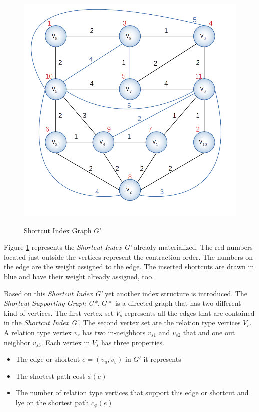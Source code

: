 \documentclass[twocolumn]{article}
\begin{document}
\begin{figure}[h]
    \caption{Shortcut Index Graph $G'$}
    \centering
    \includegraphics[width=\linewidth]{cchGraph}
    \label{fig:shortcutIndex}
\end{figure}

Figure \ref{fig:shortcutIndex} represents the \textit{Shortcut Index G'} already materialized. The red numbers
located just outside the vertices represent the contraction order. The numbers on the edge are the weight
assigned to the edge. The inserted shortcuts are drawn in blue and have their weight already assigned, too.

Based on this \textit{Shortcut Index G'} yet another index structure is introduced. The \textit{Shortcut Supporting Graph G*}.
$G*$ is a directed graph that has two different kind of vertices. The first vertex set $V_s$ represents all the
edges that are contained in the \textit{Shortcut Index G'}. The second vertex set are the relation type 
vertices $V_r$. A relation type vertex $v_r$ has two in-neighbors $v_{s1}$ and $v_{s2}$ that and one 
out neighbor $v_{s3}$. Each vertex in $V_s$ has three properties. 

\begin{itemize}
    \item The edge or shortcut $e = (v_u, v_v)$ in $G'$ it represents
    \item The shortest path cost $\phi(e)$ 
    \item The number of relation type vertices that support this edge or shortcut and lye on the shortest path $c_{\phi}(e)$
\end{itemize}
\end{document}
